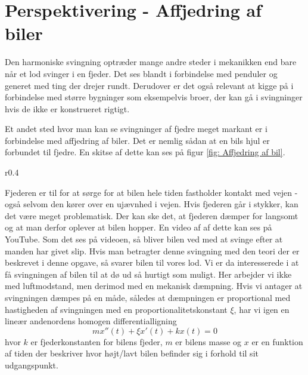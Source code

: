 \chapter{Perspektivering - Affjedring af biler}
Den harmoniske svingning optræder mange andre steder i mekanikken end bare når et lod svinger i en fjeder.
Det ses blandt i forbindelse med penduler og generet med ting der drejer rundt.
Derudover er det også relevant at kigge på i forbindelse med større bygninger som eksempelvis broer, der kan gå i svingninger hvis de ikke er konstrueret rigtigt. 

Et andet sted hvor man kan se svingninger af fjedre meget markant er i forbindelse med affjedring af biler. 
Det er nemlig sådan at en bils hjul er forbundet til fjedre. 
En skitse af dette kan ses på figur \ref{fig: Affjedring af bil}.

\begin{wrapfigure}{r}{0.4\textwidth}
\center
{}
\caption{Skitsetegning af fjeder (blå) fastsat til bils hjul.}
\label{fig: Affjedring af bil}
\end{wrapfigure}

Fjederen er til for at sørge for at bilen hele tiden fastholder kontakt med vejen - også selvom den kører over en ujævnhed i vejen. 
Hvis fjederen går i stykker, kan det være meget problematisk. 
Der kan ske det, at fjederen dæmper for langsomt og at man derfor oplever at bilen hopper.
En video af af dette kan ses på YouTube.
Som det ses på videoen, så bliver bilen ved med at svinge efter at manden har givet slip. 
Hvis man betragter denne svingning med den teori der er beskrevet i denne opgave, så svarer bilen til vores lod.
Vi er da interesserede i at få svingningen af bilen til at dø ud så hurtigt som muligt. 
Her arbejder vi ikke med luftmodstand, men derimod med en mekanisk dæmpning. 
Hvis vi antager at svingningen dæmpes på en måde, således at dæmpningen er proportional med hastigheden af svingningen med en proportionalitetskonstant $\xi$, har vi igen en lineær andenordens homogen differentialligning
$$mx''(t)+\xi x'(t) + k x(t) = 0$$
hvor $k$ er fjederkonstanten for bilens fjeder, $m$ er bilens masse og $x$ er en funktion af tiden der beskriver hvor højt/lavt bilen befinder sig i forhold til sit udgangspunkt.


